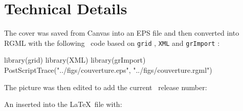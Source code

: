 \documentclass[a4paper]{article}
\begin{document}
\section{Technical Details}

The cover was saved from Canvas into an EPS file and then converted into RGML
with the following \Rlogo{}~code based on \texttt{grid} \cite{grid},
\texttt{XML} \cite{XML} and \texttt{grImport} \cite{grImport}:
 
\begin{Schunk}
\begin{Sinput}
 library(grid)
 library(XML)
 library(grImport)
 PostScriptTrace("../figs/couverture.eps", "../figs/couverture.rgml")
\end{Sinput}
\end{Schunk}

The picture was then edited to add the current \seqinr{}~release number:


\begin{Schunk}
\end{Schunk}
An inserted into the \LaTeX~file with:
\end{document}
